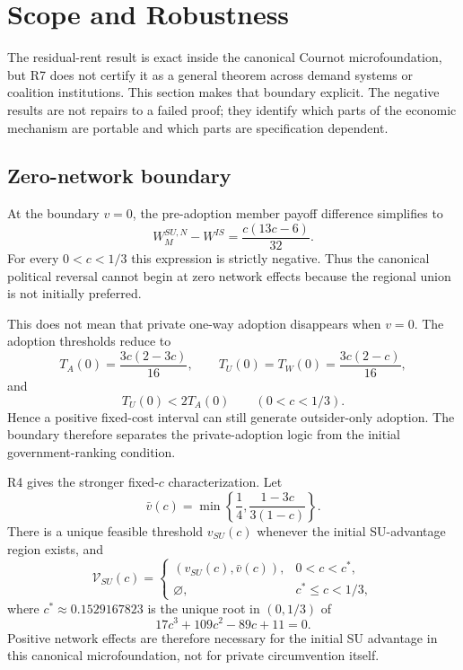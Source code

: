 \section{Scope and Robustness}
\label{sec:secondary}

The residual-rent result is exact inside the canonical Cournot microfoundation, but R7 does not certify it as a general theorem across demand systems or coalition institutions. This section makes that boundary explicit. The negative results are not repairs to a failed proof; they identify which parts of the economic mechanism are portable and which parts are specification dependent.

\subsection{Zero-network boundary}
\label{subsec:zero-network}

At the boundary $v=0$, the pre-adoption member payoff difference simplifies to
\begin{equation}
    W_M^{SU,N}-W^{IS}
    =
    \frac{c(13c-6)}{32}.
    \label{eq:zero-network-gap}
\end{equation}
For every $0<c<1/3$ this expression is strictly negative. Thus the canonical political reversal cannot begin at zero network effects because the regional union is not initially preferred.

This does not mean that private one-way adoption disappears when $v=0$. The adoption thresholds reduce to
\begin{equation}
T_A(0)=\frac{3c(2-3c)}{16},
\qquad
T_U(0)=T_W(0)=\frac{3c(2-c)}{16},
\label{eq:zero-network-adoption-thresholds}
\end{equation}
and
\begin{equation}
T_U(0)<2T_A(0)
\qquad (0<c<1/3).
\end{equation}
Hence a positive fixed-cost interval can still generate outsider-only adoption. The boundary therefore separates the private-adoption logic from the initial government-ranking condition.

R4 gives the stronger fixed-$c$ characterization. Let
\[
\bar v(c)
=
\min\left\{\frac14,\frac{1-3c}{3(1-c)}\right\}.
\]
There is a unique feasible threshold $v_{SU}(c)$ whenever the initial SU-advantage region exists, and
\begin{equation}
\mathcal V_{SU}(c)
=
\begin{cases}
(v_{SU}(c),\bar v(c)),&0<c<c^*,\\
\varnothing,&c^*\le c<1/3,
\end{cases}
\label{eq:vsu-region}
\end{equation}
where $c^*\approx0.1529167823$ is the unique root in $(0,1/3)$ of
\[
17c^3+109c^2-89c+11=0.
\]
Positive network effects are therefore necessary for the initial SU advantage in this canonical microfoundation, not for private circumvention itself.

